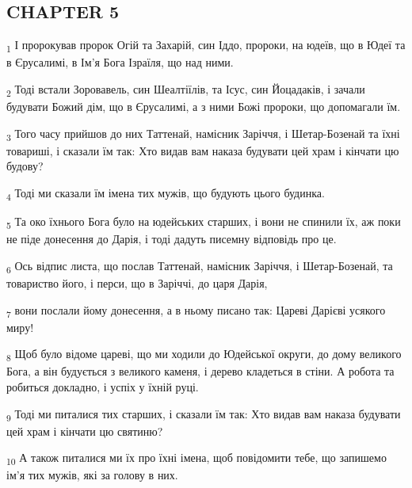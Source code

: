 \subsection{CHAPTER 5}
\begin{tcolorbox}
\textsubscript{1} І пророкував пророк Огій та Захарій, син Іддо, пророки, на юдеїв, що в Юдеї та в Єрусалимі, в Ім'я Бога Ізраїля, що над ними.
\end{tcolorbox}
\begin{tcolorbox}
\textsubscript{2} Тоді встали Зоровавель, син Шеалтіїлів, та Ісус, син Йоцадаків, і зачали будувати Божий дім, що в Єрусалимі, а з ними Божі пророки, що допомагали їм.
\end{tcolorbox}
\begin{tcolorbox}
\textsubscript{3} Того часу прийшов до них Таттенай, намісник Заріччя, і Шетар-Бозенай та їхні товариші, і сказали їм так: Хто видав вам наказа будувати цей храм і кінчати цю будову?
\end{tcolorbox}
\begin{tcolorbox}
\textsubscript{4} Тоді ми сказали їм імена тих мужів, що будують цього будинка.
\end{tcolorbox}
\begin{tcolorbox}
\textsubscript{5} Та око їхнього Бога було на юдейських старших, і вони не спинили їх, аж поки не піде донесення до Дарія, і тоді дадуть писемну відповідь про це.
\end{tcolorbox}
\begin{tcolorbox}
\textsubscript{6} Ось відпис листа, що послав Таттенай, намісник Заріччя, і Шетар-Бозенай, та товариство його, і перси, що в Заріччі, до царя Дарія,
\end{tcolorbox}
\begin{tcolorbox}
\textsubscript{7} вони послали йому донесення, а в ньому писано так: Цареві Дарієві усякого миру!
\end{tcolorbox}
\begin{tcolorbox}
\textsubscript{8} Щоб було відоме цареві, що ми ходили до Юдейської округи, до дому великого Бога, а він будується з великого каменя, і дерево кладеться в стіни. А робота та робиться докладно, і успіх у їхній руці.
\end{tcolorbox}
\begin{tcolorbox}
\textsubscript{9} Тоді ми питалися тих старших, і сказали їм так: Хто видав вам наказа будувати цей храм і кінчати цю святиню?
\end{tcolorbox}
\begin{tcolorbox}
\textsubscript{10} А також питалися ми їх про їхні імена, щоб повідомити тебе, що запишемо ім'я тих мужів, які за голову в них.
\end{tcolorbox}
